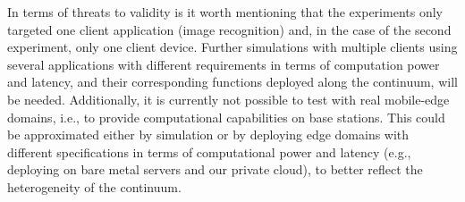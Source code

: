 


In terms of threats to validity is it worth mentioning that the experiments only targeted one client application (image recognition) and, in the case of the second experiment, only one client device. Further simulations with multiple clients using several applications with different requirements in terms of computation power and latency, and their corresponding functions deployed along the continuum, will be needed. Additionally, it is currently not possible to test with real mobile-edge domains, i.e., to provide computational capabilities on base stations. This could be approximated either by simulation or by deploying edge domains with different specifications in terms of computational power and latency (e.g., deploying on bare metal servers and our private cloud), to better reflect the heterogeneity of the continuum. %



